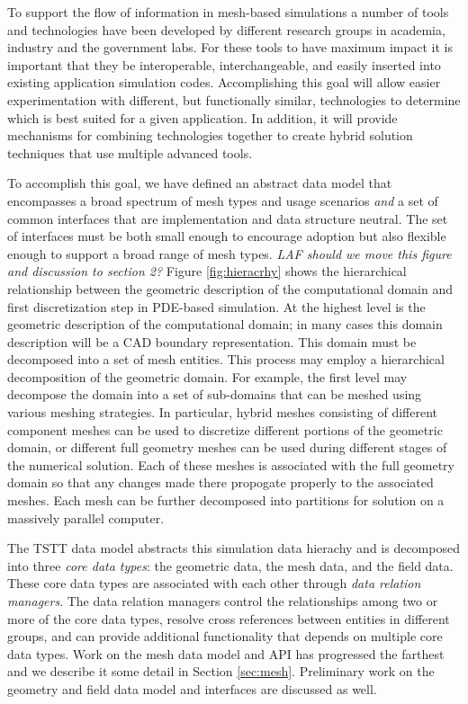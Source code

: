 To support the flow of information in mesh-based simulations a number
of tools and technologies have been developed by different research
groups in academia, industry and the government labs.  For these tools
to have maximum impact it is important that they be interoperable,
interchangeable, and easily inserted into existing application
simulation codes.  Accomplishing this goal will allow easier
experimentation with different, but functionally similar, technologies
to determine which is best suited for a given application.  In
addition, it will provide mechanisms for combining technologies
together to create hybrid solution techniques that use multiple
advanced tools.

To accomplish this goal, we have defined an abstract data model that
encompasses a broad spectrum of mesh types and usage scenarios {\it
and} a set of common interfaces that are implementation and data
structure neutral.  The set of interfaces must be both small enough to
encourage adoption but also flexible enough to support a broad range
of mesh types.  {\it LAF should we move this figure and discussion to
section 2?} Figure \ref{fig:hieracrhy} shows the hierarchical
relationship between the geometric description of the computational
domain and first discretization step in PDE-based simulation.  At the
highest level is the geometric description of the computational
domain; in many cases this domain description will be a CAD boundary
representation.  This domain must be decomposed into a set of mesh
entities. This process may employ a hierarchical decomposition of the
geometric domain. For example, the first level may decompose the
domain into a set of sub-domains that can be meshed using various
meshing strategies.  In particular, hybrid meshes consisting of
different component meshes can be used to discretize different
portions of the geometric domain, or different full geometry meshes
can be used during different stages of the numerical solution.  Each
of these meshes is associated with the full geometry domain so that
any changes made there propogate properly to the associated meshes.
Each mesh can be further decomposed into partitions for solution on a
massively parallel computer.

The TSTT data model abstracts this simulation data hierachy and is
decomposed into three {\it core data types}: the geometric data, the
mesh data, and the field data.  These core data types are associated
with each other through {\it data relation managers}. The data
relation managers control the relationships among two or more of the
core data types, resolve cross references between entities in
different groups, and can provide additional functionality that
depends on multiple core data types.  Work on the mesh data model and
API has progressed the farthest and we describe it some detail in
Section \ref{sec:mesh}.  Preliminary work on the geometry and field
data model and interfaces are discussed as well.

